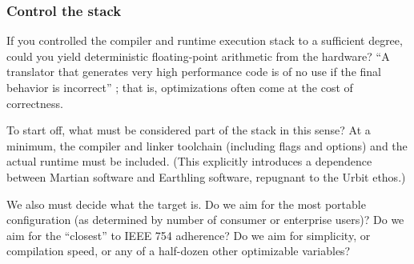 \documentclass[twoside]{article}
\begin{document}
\subsubsection{Control the stack}

If you controlled the compiler and runtime execution stack to a sufficient degree, could you yield deterministic floating-point arithmetic from the hardware?  “A translator that generates very high performance code is of no use if the final behavior is incorrect” \citep[p.~189]{Jones2008}; that is, optimizations often come at the cost of correctness.

To start off, what must be considered part of the stack in this sense?  At a minimum, the compiler and linker toolchain (including flags and options) and the actual runtime must be included.  (This explicitly introduces a dependence between Martian software and Earthling software, repugnant to the Urbit ethos.)

We also must decide what the target is.  Do we aim for the most portable configuration (as determined by number of consumer or enterprise users)?  Do we aim for the “closest” to IEEE 754 adherence?  Do we aim for simplicity, or compilation speed, or any of a half-dozen other optimizable variables?
\end{document}
